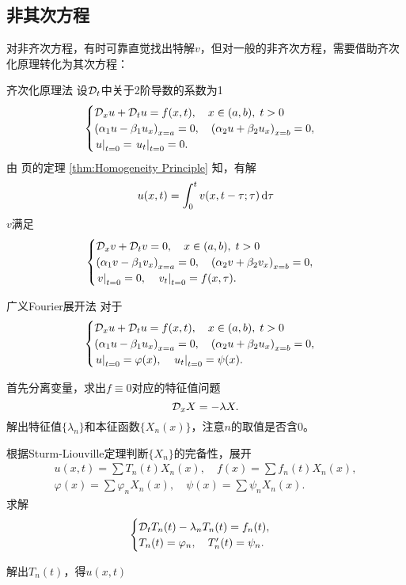 \subsection{非其次方程}
对非齐次方程，有时可靠直觉找出特解$v$，但对一般的非齐次方程，需要借助齐次化原理转化为其次方程：
\begin{method}{齐次化原理法}{}
	设$\mathcal D_t$中关于2阶导数的系数为1
	\begin{align*}
		\begin{cases}
			\mathcal D_xu+\mathcal D_tu=f(x,t),\quad x\in(a,b),\;t>0\\
			\left(\alpha_1u-\beta_1u_x\right)_{x=a}=0,\quad\left(\alpha_2u+\beta_2u_x\right)_{x=b}=0,\\
			\left.u\right\rvert_{t=0}=\left.u_t\right\rvert_{t=0}=0.
		\end{cases}
	\end{align*}
	由 \pageref{thm:Homogeneity Principle} 页的定理 \ref{thm:Homogeneity Principle} 知，有解
	\[
		u(x,t)=\int_0^tv(x,t-\tau;\tau)\mathop{}\!\mathrm{d}\tau
	\]
	$v$满足
	\begin{align*}
		\begin{cases}
			\mathcal D_xv+\mathcal D_tv=0,\quad x\in(a,b),\;t>0\\
			\left(\alpha_1v-\beta_1v_x\right)_{x=a}=0,\quad\left(\alpha_2v+\beta_2v_x\right)_{x=b}=0,\\
			\left.v\right\rvert_{t=0}=0,\quad\left.v_t\right\rvert_{t=0}=f(x,\tau).
		\end{cases}
	\end{align*}
\end{method}
\begin{method}{广义Fourier展开法}{}
	对于 
	\begin{align*}
		\begin{cases}
			\mathcal D_xu+\mathcal D_tu=f(x,t),\quad x\in(a,b),\;t>0\\
			\left(\alpha_1u-\beta_1u_x\right)_{x=a}=0,\quad\left(\alpha_2u+\beta_2u_x\right)_{x=b}=0,\\
			\left.u\right\rvert_{t=0}=\varphi(x),\quad\left.u_t\right\rvert_{t=0}=\psi(x).
		\end{cases}
	\end{align*}
	\begin{compactenum}
		\item 首先分离变量，求出$f\equiv 0$对应的特征值问题
		\[
			\mathcal D_xX=-\lambda X.
		\]
		解出特征值$\{\lambda_n\}$和本征函数$\{X_n(x)\}$，注意$n$的取值是否含0。
		\item 根据Sturm-Liouville定理判断$\{X_n\}$的完备性，展开
		\begin{gather*}
			u(x,t)=\sum T_n(t)X_n(x),\quad f(x)=\sum f_n(t)X_n(x),\\
			\varphi(x)=\sum\varphi_nX_n(x),\quad \psi(x)=\sum\psi_nX_n(x).
		\end{gather*}
		求解 
		\begin{align*}
			\begin{cases}
				\mathcal D_tT_n(t)-\lambda_nT_n(t)=f_n(t),\\
				T_n(t)=\varphi_n,\quad T_n'(t)=\psi_n.
			\end{cases}
		\end{align*}
		\item 解出$T_n(t)$，得$u(x,t)$
	\end{compactenum}
\end{method}
